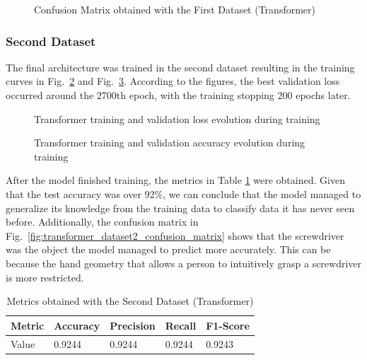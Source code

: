 \begin{figure}[H]
    \centering
    {\fontsize{10}{12}\selectfont}
    \caption[Confusion Matrix obtained with the First Dataset (Transformer)]{Confusion Matrix obtained with the First Dataset (Transformer)}
    \label{fig:transformer_dataset1_confusion_matrix}
\end{figure}

\subsubsection{Second Dataset}

The final architecture was trained in the second dataset resulting in the training curves in Fig.~\ref{fig:transformer_loss} and Fig.~\ref{fig:transformer_acc}. According to the figures, the best validation loss occurred around the 2700th epoch, with the training stopping 200 epochs later.

\begin{figure}[H]
    \centering
    {\fontsize{10}{12}\selectfont}
    \caption[Transformer training and validation loss evolution during training]{Transformer training and validation loss evolution during training}
    \label{fig:transformer_loss}
\end{figure}

\begin{figure}[H]
    \centering
    {\fontsize{10}{12}\selectfont}
    \caption[Transformer training and validation accuracy evolution during training]{Transformer training and validation accuracy evolution during training}
    \label{fig:transformer_acc}
\end{figure}

After the model finished training, the metrics in Table \ref{table:transformer_dataset2_results} were obtained. Given that the test accuracy was over 92\%, we can conclude that the model managed to generalize its knowledge from the training data to classify data it has never seen before. Additionally, the confusion matrix in Fig.~\ref{fig:transformer_dataset2_confusion_matrix} shows that the screwdriver was the object the model managed to predict more accurately. This can be because the hand geometry that allows a person to intuitively grasp a screwdriver is more restricted.

\begin{table}[H]
    \centering
    \caption{Metrics obtained with the Second Dataset (Transformer)}
    \label{table:transformer_dataset2_results}
    \begin{tabular}{|l|l|l|l|l|}
        \hline
        Metric & Accuracy & Precision & Recall & F1-Score \\
        \hline
        Value & 0.9244 & 0.9244 & 0.9244 & 0.9243 \\
        \hline
    \end{tabular}
\end{table}

